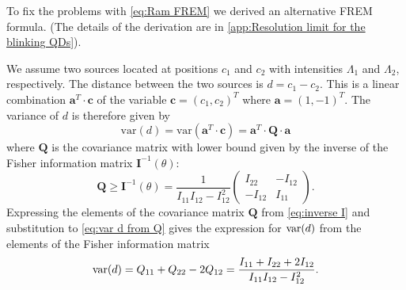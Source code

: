 To fix the problems with \autoref{eq:Ram FREM} we derived an alternative FREM formula. (The details of the derivation are in \autoref{app:Resolution limit for the blinking QDs}). 

We assume two sources located at positions $c_1$ and $c_2$ with intensities $\Lambda_1$ and $\Lambda_2$, respectively. The distance between the two sources is $d=c_1-c_2$. This is a linear combination $\bm{a}^{T}\cdot\bm{c}$ of the variable $\bm{c}=(c_1,c_2)^{T}$ where $\bm{a}=(1,-1)^{T}$. The variance of $d$ is therefore given by 
%
\begin{equation}
	\textrm{var}(d)=\textrm{var}(\bm{a}^{T}\cdot\bm{c})=\bm{a}^{T}\cdot\bm{Q}\cdot\bm{a}
	\label{eq:var d from Q}
\end{equation}
%
where $\bm{Q}$ is the covariance matrix with lower bound given by the inverse of the Fisher information matrix $\bm{I}^{-1}(\theta)$: 
%
\begin{equation}
	\bm{Q}\geq\bm{I}^{-1}(\theta)=\frac{1}{I_{11}I_{12}-I_{12}^2}\left(
	\begin{array}{cc}
		I_{22} & -I_{12}\\
		-I_{12} & I_{11}
	\end{array}\right).
	\label{eq:inverse I}
\end{equation}
%
Expressing the elements of the covariance matrix $\bm{Q}$ from \autoref{eq:inverse I} and substitution to \autoref{eq:var d from Q} gives the expression for $\mathrm{var}(d)$ from the elements of the Fisher information matrix
%
\begin{equation}
	\mathrm{var}(d)=Q_{11}+Q_{22}-2Q_{12}=\frac{I_{11}+I_{22}+2I_{12}}{I_{11}I_{12}-I_{12}^2}.
	\label{eq:variance d alternative}
\end{equation}

